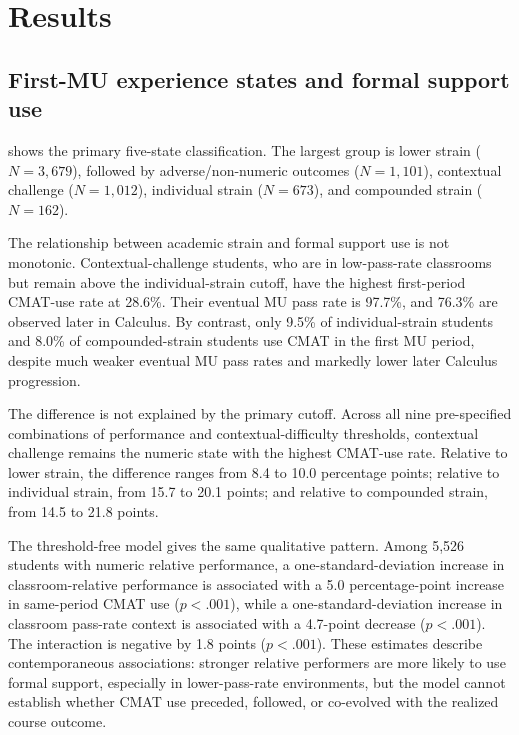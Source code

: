 \section{Results}

\subsection{First-MU experience states and formal support use}

 shows the primary five-state classification. The largest group is lower strain ($N=3{,}679$), followed by adverse/non-numeric outcomes ($N=1{,}101$), contextual challenge ($N=1{,}012$), individual strain ($N=673$), and compounded strain ($N=162$).

The relationship between academic strain and formal support use is not monotonic. Contextual-challenge students, who are in low-pass-rate classrooms but remain above the individual-strain cutoff, have the highest first-period CMAT-use rate at 28.6\%. Their eventual MU pass rate is 97.7\%, and 76.3\% are observed later in Calculus. By contrast, only 9.5\% of individual-strain students and 8.0\% of compounded-strain students use CMAT in the first MU period, despite much weaker eventual MU pass rates and markedly lower later Calculus progression.

The difference is not explained by the primary cutoff. Across all nine pre-specified combinations of performance and contextual-difficulty thresholds, contextual challenge remains the numeric state with the highest CMAT-use rate. Relative to lower strain, the difference ranges from 8.4 to 10.0 percentage points; relative to individual strain, from 15.7 to 20.1 points; and relative to compounded strain, from 14.5 to 21.8 points.

The threshold-free model gives the same qualitative pattern. Among 5,526 students with numeric relative performance, a one-standard-deviation increase in classroom-relative performance is associated with a 5.0 percentage-point increase in same-period CMAT use ($p<.001$), while a one-standard-deviation increase in classroom pass-rate context is associated with a 4.7-point decrease ($p<.001$). The interaction is negative by 1.8 points ($p<.001$). These estimates describe contemporaneous associations: stronger relative performers are more likely to use formal support, especially in lower-pass-rate environments, but the model cannot establish whether CMAT use preceded, followed, or co-evolved with the realized course outcome.

